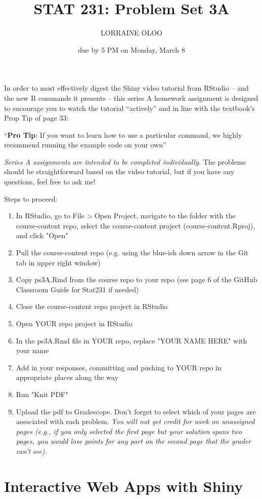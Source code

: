 \documentclass[
]{article}
\title{STAT 231: Problem Set 3A}
\author{LORRAINE OLOO}
\date{due by 5 PM on Monday, March 8}
\begin{document}
\maketitle

In order to most effectively digest the Shiny video tutorial from
RStudio -- and the new R commands it presents -- this series A homework
assignment is designed to encourage you to watch the tutorial
``actively'' and in line with the textbook's Prop Tip of page 33:

``\textbf{Pro Tip}: If you want to learn how to use a particular
command, we highly recommend running the example code on your own''

\emph{Series A assignments are intended to be completed individually.}
The problems should be straightforward based on the video tutorial, but
if you have any questions, feel free to ask me!

Steps to proceed:

\begin{enumerate}
\item In RStudio, go to File > Open Project, navigate to the folder with the course-content repo, select the course-content project (course-content.Rproj), and click "Open" 
\item Pull the course-content repo (e.g. using the blue-ish down arrow in the Git tab in upper right window)
\item Copy ps3A.Rmd from the course repo to your repo (see page 6 of the GitHub Classroom Guide for Stat231 if needed)
\item Close the course-content repo project in RStudio
\item Open YOUR repo project in RStudio
\item In the ps3A.Rmd file in YOUR repo, replace "YOUR NAME HERE" with your name
\item Add in your responses, committing and pushing to YOUR repo in appropriate places along the way
\item Run "Knit PDF" 
\item Upload the pdf to Gradescope.  Don't forget to select which of your pages are associated with each problem.  \textit{You will not get credit for work on unassigned pages (e.g., if you only selected the first page but your solution spans two pages, you would lose points for any part on the second page that the grader can't see).} 
\end{enumerate}

\newpage

\hypertarget{interactive-web-apps-with-shiny}{%
\section{Interactive Web Apps with
Shiny}\label{interactive-web-apps-with-shiny}}
\end{document}
